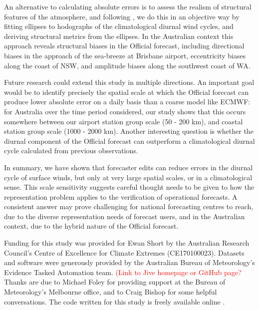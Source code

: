 \documentclass{ametsoc}
\begin{document}
An alternative to calculating absolute errors is to assess the realism of structural features of the atmosphere, and following \citet{gille05}, we do this in an objective way by fitting ellipses to hodographs of the climatological diurnal wind cycles, and deriving structural metrics from the ellipses. In the Australian context this approach reveals structural biases in the Official forecast, including directional biases in the approach of the sea-breeze at Brisbane airport, eccentricity biases along the coast of NSW, and amplitude biases along the southwest coast of WA.  

Future research could extend this study in multiple directions. An important goal would be to identify precisely the spatial scale at which the Official forecast can produce lower absolute error on a daily basis than a coarse model like ECMWF: for Australia over the time period considered, our study shows that this occurs somewhere between our airport station group scale (50 - 200 km), and coastal station group scale (1000 - 2000 km). Another interesting question is whether the diurnal component of the Official forecast can outperform a climatological diurnal cycle calculated from previous observations. 

In summary, we have shown that forecaster edits can reduce errors in the diurnal cycle of surface winds, but only at very large spatial scales, or in a climatological sense. This scale sensitivity suggests careful thought needs to be given to how the representation problem applies to the verification of operational forecasts. A consistent answer may prove challenging for national forecasting centres to reach, due to the diverse representation needs of forecast users, and in the Australian context, due to the hybrid nature of the Official forecast.

\acknowledgments
Funding for this study was provided for Ewan Short by the Australian Research Council's Centre of Excellence for Climate Extremes (CE170100023). Datasets and software were generously provided by the Australian Bureau of Meteorology's Evidence Tasked Automation team. \textcolor{red}{(Link to Jive homepage or GitHub page?} Thanks are due to Michael Foley for providing support at the Bureau of Meteorology's Melbourne office, and to Craig Bishop for some helpful conversations. The code written for this study is freely available online \citep{shortGitVeri19}.



\end{document}
